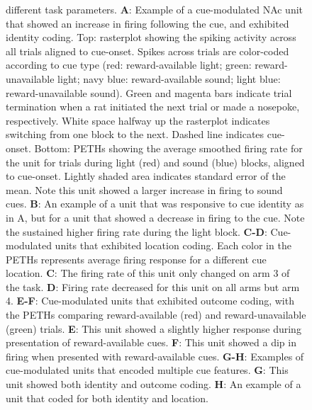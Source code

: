 \documentclass[11pt]{article}
\newcommand{\bsf}[1]{\textbf{#1}}
\providecommand{\DIFadd}[1]{{\protect\color{red} \sf #1}} %
\providecommand{\DIFdel}[1]{} %
\providecommand{\DIFaddFL}[1]{\DIFadd{#1}} %
\providecommand{\DIFdelFL}[1]{\DIFdel{#1}} %
\providecommand{\DIFaddbeginFL}{} %
\providecommand{\DIFaddendFL}{} %
\providecommand{\DIFdelbeginFL}{} %
\providecommand{\DIFdelendFL}{} %
\newcommand{\DIFscaledelfig}{0.5}
\newlength{\DIFdelgraphicswidth} %
\newlength{\DIFdelgraphicsheight} %
\newcommand{\DIFaddincludegraphics}[2][]{{\color{red}\fbox{\DIFOincludegraphics[#1]{#2}}}} %
\newcommand{\DIFdelincludegraphics}[2][]{%
\sbox{\DIFdelgraphicsbox}{\DIFOincludegraphics[#1]{#2}}%
\settoboxwidth{\DIFdelgraphicswidth}{\DIFdelgraphicsbox} %
\settoboxtotalheight{\DIFdelgraphicsheight}{\DIFdelgraphicsbox} %
\scalebox{\DIFscaledelfig}{%
\parbox[b]{\DIFdelgraphicswidth}{\usebox{\DIFdelgraphicsbox}\\[-\baselineskip] \rule{\DIFdelgraphicswidth}{0em}}\llap{\resizebox{\DIFdelgraphicswidth}{\DIFdelgraphicsheight}{%
\setlength{\unitlength}{\DIFdelgraphicswidth}%
\begin{picture}(1,1)%
\thicklines\linethickness{2pt} %
{\color[rgb]{1,0,0}\put(0,0){\framebox(1,1){}}}%
{\color[rgb]{1,0,0}\put(0,0){\line( 1,1){1}}}%
{\color[rgb]{1,0,0}\put(0,1){\line(1,-1){1}}}%
\end{picture}%
}\hspace*{3pt}}} %
} %
\DeclareRobustCommand{\DIFaddbeginFL}{\DIFOaddbeginFL \let\includegraphics\DIFaddincludegraphics} %
\DeclareRobustCommand{\DIFaddendFL}{\DIFOaddendFL \let\includegraphics\DIFOincludegraphics} %
\DeclareRobustCommand{\DIFdelbeginFL}{\DIFOdelbeginFL \let\includegraphics\DIFdelincludegraphics} %
\DeclareRobustCommand{\DIFdelendFL}{\DIFOaddendFL \let\includegraphics\DIFOincludegraphics} %
\begin{document}
\begin{figure}[ht!]
{{  }\DIFdelendFL \DIFaddbeginFL \DIFaddFL{different }\DIFaddendFL task parameters. \bsf{A}: Example of a cue-modulated NAc unit that showed an increase in firing following the cue, and \DIFdelbeginFL \DIFdelFL{encoded cue }\DIFdelendFL \DIFaddbeginFL \DIFaddFL{exhibited }\DIFaddendFL identity \DIFaddbeginFL \DIFaddFL{coding}\DIFaddendFL . Top: rasterplot showing the spiking activity across all trials aligned to cue-onset. Spikes across trials are color-coded according to cue type (red: reward-available light; green: reward-unavailable light; navy blue: reward-available sound; light blue: reward-unavailable sound). Green and magenta bars indicate trial termination when a rat initiated the next trial or made a nosepoke, respectively. White space halfway up the rasterplot indicates switching from one block to the next. Dashed line indicates \DIFdelbeginFL \DIFdelFL{cue onset}\DIFdelendFL \DIFaddbeginFL \DIFaddFL{cue-onset}\DIFaddendFL . Bottom: PETHs showing the average smoothed firing rate for the unit for trials during light (red) and sound (blue) blocks, aligned to cue-onset. Lightly shaded area indicates standard error of the mean. Note this unit showed a larger increase in firing to sound cues. \bsf{B}: An example of a unit that was responsive to cue identity as in A, but for a unit that showed a decrease in firing to the cue. Note the sustained higher firing rate during the light block. \bsf{C-D}: Cue-modulated units that \DIFdelbeginFL \DIFdelFL{encoded cue }\DIFdelendFL \DIFaddbeginFL \DIFaddFL{exhibited }\DIFaddendFL location \DIFdelbeginFL \DIFdelFL{, each }\DIFdelendFL \DIFaddbeginFL \DIFaddFL{coding. Each }\DIFaddendFL color in the PETHs represents average firing response for a different cue location. \bsf{C}: The firing rate of this unit only changed on arm 3 of the task. \bsf{D}: Firing \DIFaddbeginFL \DIFaddFL{rate }\DIFaddendFL decreased for this unit on all arms but arm 4. \bsf{E-F}: Cue-modulated units that \DIFdelbeginFL \DIFdelFL{encoded cue }\DIFdelendFL \DIFaddbeginFL \DIFaddFL{exhibited }\DIFaddendFL outcome \DIFaddbeginFL \DIFaddFL{coding}\DIFaddendFL , with the PETHs comparing reward-available (red) and reward-unavailable (green) trials. \bsf{E}: This unit showed a slightly higher response during presentation of reward-available cues. \bsf{F}: This unit showed a dip in firing when presented with reward-available cues. \bsf{G-H}: Examples of cue-modulated units that encoded multiple cue features. \bsf{G}: This unit \DIFdelbeginFL \DIFdelFL{integrated cue }\DIFdelendFL \DIFaddbeginFL \DIFaddFL{showed both }\DIFaddendFL identity and outcome \DIFaddbeginFL \DIFaddFL{coding}\DIFaddendFL . \bsf{H}: An example of a unit that \DIFdelbeginFL \DIFdelFL{integrated cue }\DIFdelendFL \DIFaddbeginFL \DIFaddFL{coded for both }\DIFaddendFL identity and location.}
\label{fig:examples}
\end{figure} \clearpage
\end{document}
